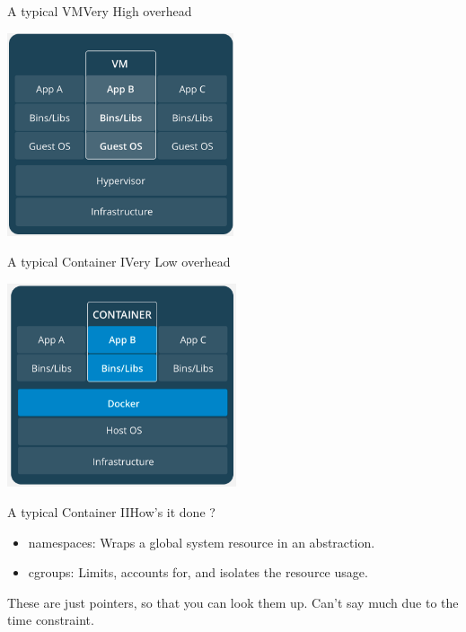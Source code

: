 \documentclass{beamer}
\begin{document}
\begin{frame}{A typical VM}{Very High overhead}
\begin{center}
    \includegraphics[height=6cm]{vm.png}
\end{center}
\end{frame}

\begin{frame}{A typical Container I}{Very Low overhead}
\begin{center}
    \includegraphics[height=6cm]{docker.png}
\end{center}
\end{frame}

\begin{frame}{A typical Container II}{How's it done ?}
    {\LARGE 
    \begin{itemize}
        \item \alert{namespaces}: Wraps a global system resource in an abstraction.
        \item \alert{cgroups}: Limits, accounts for, and isolates the resource usage.
    \end{itemize}
    }
    \vfill
    These are just pointers, so that you can look them up. Can't say much due to the time constraint.
\end{frame}
\end{document}
